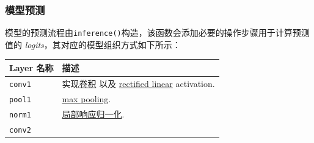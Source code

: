 \subsubsection{模型预测 }\label{ux6a21ux578bux9884ux6d4b}

模型的预测流程由\texttt{inference()}构造，该函数会添加必要的操作步骤用于计算预测值的
\emph{logits}，其对应的模型组织方式如下所示：

\begin{longtable}[c]{@{}ll@{}}
\toprule
\begin{minipage}[b]{0.05\columnwidth}\raggedright\strut
Layer 名称
\strut\end{minipage} &
\begin{minipage}[b]{0.05\columnwidth}\raggedright\strut
描述
\strut\end{minipage}\tabularnewline
\midrule
\endhead
\begin{minipage}[t]{0.05\columnwidth}\raggedright\strut
\texttt{conv1}
\strut\end{minipage} &
\begin{minipage}[t]{0.05\columnwidth}\raggedright\strut
实现\href{https://github.com/jikexueyuanwiki/tensorflow-zh/blob/master/SOURCE/api_docs/python/nn.md\#conv2d}{卷积}
以及
\href{https://github.com/jikexueyuanwiki/tensorflow-zh/blob/master/SOURCE/api_docs/python/nn.md\#relu}{rectified
linear} activation.
\strut\end{minipage}\tabularnewline
\begin{minipage}[t]{0.05\columnwidth}\raggedright\strut
\texttt{pool1}
\strut\end{minipage} &
\begin{minipage}[t]{0.05\columnwidth}\raggedright\strut
\href{https://github.com/jikexueyuanwiki/tensorflow-zh/blob/master/SOURCE/api_docs/python/nn.md\#max_pool}{max
pooling}.
\strut\end{minipage}\tabularnewline
\begin{minipage}[t]{0.05\columnwidth}\raggedright\strut
\texttt{norm1}
\strut\end{minipage} &
\begin{minipage}[t]{0.05\columnwidth}\raggedright\strut
\href{https://github.com/jikexueyuanwiki/tensorflow-zh/blob/master/SOURCE/api_docs/python/nn.md\#local_response_normalization}{局部响应归一化}.
\strut\end{minipage}\tabularnewline
\begin{minipage}[t]{0.05\columnwidth}\raggedright\strut
\texttt{conv2}
\strut\end{minipage} &

\end{longtable}
